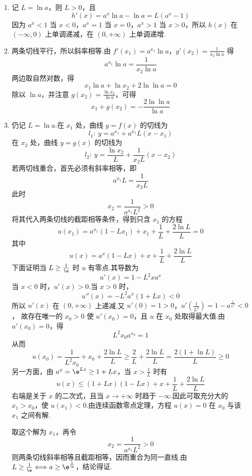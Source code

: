 \begin{solution}
\begin{enumerate}
\item 记 \(L=\ln a\)，则 \(L>0\)，且
\[
h'(x)=a^x\ln a-\ln a=L(a^x-1)
\]
因为 \(a^x<1\) 当 \(x<0\)，\(a^x=1\) 当 \(x=0\)，\(a^x>1\) 当 \(x>0\)，所以 \(h(x)\) 在 \((-\infty,0)\) 上单调递减，在 \((0,+\infty)\) 上单调递增.

\item 两条切线平行，所以斜率相等.由
\(f'(x_1)=a^{x_1}\ln a\)，\(g'(x_2)=\frac1{x_2\ln a}\)
得
\[
a^{x_1}\ln a=\frac1{x_2\ln a}
\]
两边取自然对数，得
\[
x_1\ln a+\ln x_2+2\ln\ln a=0
\]
除以 \(\ln a\)，并注意 \(g(x_2)=\frac{\ln x_2}{\ln a}\)，可得
\[
x_1+g(x_2)=-\frac{2\ln\ln a}{\ln a}
\]

\item 仍记 \(L=\ln a\).在 \(x_1\) 处，曲线 \(y=f(x)\) 的切线为
\[
l_1:\ y=a^{x_1}+a^{x_1}L(x-x_1)
\]
在 \(x_2\) 处，曲线 \(y=g(x)\) 的切线为
\[
l_2:\ y=\frac{\ln x_2}{L}+\frac1{x_2L}(x-x_2)
\]
若两切线重合，首先必须有斜率相等，即
\[
a^{x_1}L=\frac1{x_2L}
\]
此时
\[
x_2=\frac1{a^{x_1}L^2}>0
\]
将其代入两条切线的截距相等条件，得到只含 \(x_1\) 的方程
\[
u(x_1)=a^{x_1}(1-Lx_1)+x_1+\frac1L+\frac{2\ln L}{L}=0
\]
其中
\[
u(x)=a^x(1-Lx)+x+\frac1L+\frac{2\ln L}{L}
\]
下面证明当 \(L\ge\frac1\e\) 时 \(u\) 有零点.其导数为
\[
u'(x)=1-L^2xa^x
\]
当 \(x<0\) 时，\(u'(x)>0\).当 \(x>0\) 时，
\[
u''(x)=-L^2a^x(1+Lx)<0
\]
所以 \(u'(x)\) 在 \((0,+\infty)\) 上递减.又
\(u'(0)=1>0\)，\(u'\left(\frac1{L^2}\right)=1-a^{\frac{1}{L^2}}<0\)，
故存在唯一的 \(x_0>0\) 使 \(u'(x_0)=0\)，且 \(u\) 在 \(x_0\) 处取得最大值.由 \(u'(x_0)=0\)，得
\[
L^2x_0a^{x_0}=1
\]
从而
\[
u(x_0)=\frac1{L^2x_0}+x_0+\frac{2\ln L}{L}
\ge\frac2L+\frac{2\ln L}{L}
=\frac{2(1+\ln L)}{L}\ge0
\]
另一方面，由 \(a^x=\e^{Lx}\ge1+Lx\)，当 \(x>\frac1L\) 时有
\[
u(x)\le(1+Lx)(1-Lx)+x+\frac1L+\frac{2\ln L}{L}
\]
右端是关于 \(x\) 的二次式，且当 \(x\to+\infty\) 时趋于 \(-\infty\).因此可取充分大的 \(x_1>x_0\)，使 \(u(x_1)<0\).由连续函数零点定理，方程 \(u(x)=0\) 在 \(x_0\) 与该 \(x_1\) 之间有解.

取这个解为 \(x_1\)，再令
\[
x_2=\frac1{a^{x_1}L^2}>0
\]
则两条切线斜率相等且截距相等，因而重合为同一直线.由 \(L\ge\frac1\e\Longleftrightarrow a\ge \e^{\frac{1}{\e}}\)，结论得证.
\end{enumerate}
\end{solution}
